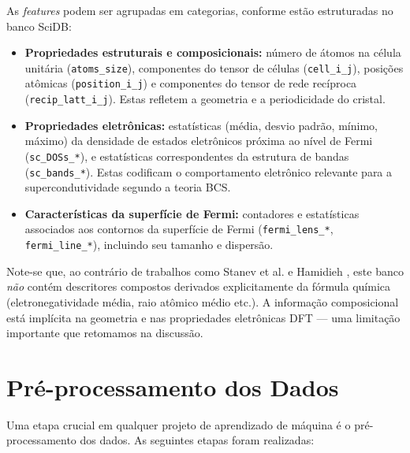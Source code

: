 \documentclass[12pt, a4paper, oneside]{report}
\begin{document}
As \textit{features} podem ser agrupadas em categorias, conforme estão estruturadas no banco SciDB:
\begin{itemize}
    \item \textbf{Propriedades estruturais e composicionais:} número de átomos na célula unitária (\texttt{atoms\_size}), componentes do tensor de células (\texttt{cell\_i\_j}), posições atômicas (\texttt{position\_i\_j}) e componentes do tensor de rede recíproca (\texttt{recip\_latt\_i\_j}). Estas refletem a geometria e a periodicidade do cristal.
    \item \textbf{Propriedades eletrônicas:} estatísticas (média, desvio padrão, mínimo, máximo) da densidade de estados eletrônicos próxima ao nível de Fermi (\texttt{sc\_DOSs\_*}), e estatísticas correspondentes da estrutura de bandas (\texttt{sc\_bands\_*}). Estas codificam o comportamento eletrônico relevante para a supercondutividade segundo a teoria BCS.
    \item \textbf{Características da superfície de Fermi:} contadores e estatísticas associados aos contornos da superfície de Fermi (\texttt{fermi\_lens\_*}, \texttt{fermi\_line\_*}), incluindo seu tamanho e dispersão.
\end{itemize}
Note-se que, ao contrário de trabalhos como Stanev et al. \cite{stanev2018} e Hamidieh \cite{hamidieh2018}, este banco \emph{não} contém descritores compostos derivados explicitamente da fórmula química (eletronegatividade média, raio atômico médio etc.). A informação composicional está implícita na geometria e nas propriedades eletrônicas DFT --- uma limitação importante que retomamos na discussão.

\section{Pré-processamento dos Dados}

Uma etapa crucial em qualquer projeto de aprendizado de máquina é o pré-processamento dos dados. As seguintes etapas foram realizadas:
\end{document}
